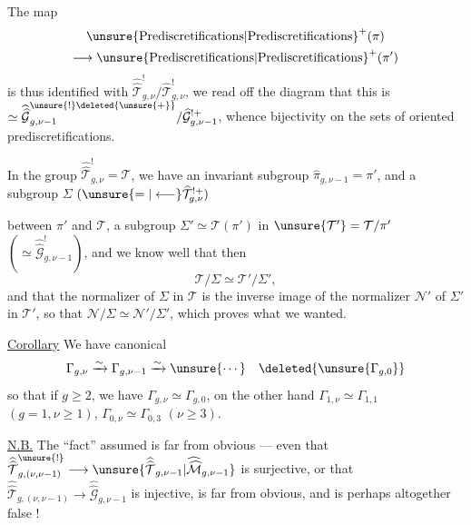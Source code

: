 The map 
\begin{multline*}\unsure{\text{Prediscretifications}|\text{Prediscretifications}}^{+}(\pi)\\\longrightarrow
\unsure{\text{Prediscretifications}|\text{Prediscretifications}}^{+}(\pi')\end{multline*} is thus identified with
$\widehat{\widehat{\mathcal T}}_{g,\nu}^{!}/\widehat{\mathcal T}_{g,\nu}^{!}$,
we read off the diagram that this is
$\simeq\widehat{\widehat{\mathcal G}}_{g,\nu-1}^{\unsure{!}\deleted{\unsure{+}}}/
\widehat{\mathcal G}_{g,\nu-1}^{!+}$,
whence bijectivity on the sets of oriented prediscretifications.

In the group $\widehat{\widehat{\mathcal T}}_{g,\nu}^{!}=\mathcal T$,
we have an invariant subgroup $\widehat{\pi}_{g,\nu-1}=\pi'$,
and a subgroup $\Sigma$ $(\unsure{=|\longleftarrow}\widehat{\mathcal T}_{g,\nu}^{!+})$


between $\pi'$ and $\mathcal T$,   a subgroup $\Sigma'\simeq\mathcal T(\pi')$ in $\unsure{\mathcal T'}=\mathcal T/\pi'$ $(\simeq\widehat{\widehat{\mathcal G}}^{!}_{g,\nu-1})$, and we know well that then
\[
\mathcal T/\Sigma\simeq\mathcal T'/\Sigma',
\]
and  that the normalizer  of $\Sigma$ in $\mathcal T$ is the inverse image of the normalizer $\mathcal N'$ of $\Sigma'$ in $\mathcal T'$, so that $\mathcal N/\Sigma\simeq\mathcal N'/\Sigma'$, which proves what we wanted.

\uline{Corollary} We have canonical 
\[
\Gamma_{g,\nu}\xrightarrow{\sim}\Gamma_{g,\nu-1}\xrightarrow{\sim}\unsure{\cdots}\quad\deleted{\unsure{\Gamma_{g,0}}}
\]
so that if $g\geq2$, we have  $\Gamma_{g,\nu}\simeq\Gamma_{g,0}$, on the other hand $\Gamma_{1,\nu}\simeq\Gamma_{1,1}$ $(g=1,\nu\geq1)$, $\Gamma_{0,\nu}\simeq\Gamma_{0,3}$ $(\nu\geq3)$.

\uline{N.B.} The ``fact''  assumed is far from obvious --- even that $\widehat{\widehat{\mathcal T}}^{\unsure{!}}_{g,(\nu,\nu-1)}\longrightarrow\unsure{\widehat{\widehat{\mathcal T}}_{g,\nu-1}|\widehat{\widehat{\mathcal M}}_{g,\nu-1}}$ is surjective, or that $\widehat{\widehat{\mathcal T}}_{g,(\nu,\nu-1)}\longrightarrow\widehat{\widehat{\mathcal G}}_{g,\nu-1}$ is injective, is far from obvious, and is perhaps altogether false !

